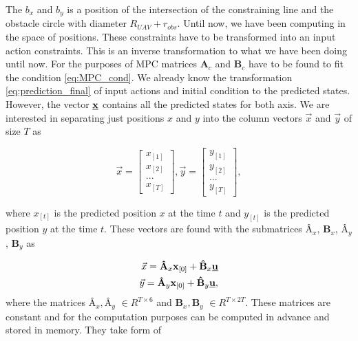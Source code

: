 \documentclass[a4paper,11pt,titlepage]{article}
\newcommand{\uvec}{\textbf{\underline{u}}}
\begin{document}
The $b_x$ and $b_y$ is a position of the intersection of the constraining line and the obstacle circle with diameter $R_{UAV}+r_{obs}$. 
Until now, we have been computing in the space of positions. These constraints have to be transformed into an input action constraints. This is an inverse transformation to what we have been doing until now. For the purposes of MPC matrices $\textbf{A}_c $ and $\textbf{B}_c$ have to be found to fit the condition \ref{eq:MPC_cond}. We already know the transformation \ref{eq:prediction_final} of input actions and initial condition to the predicted states. However, the vector $\textbf{\underline{x}}$ contains all the predicted states for both axis. We are interested in separating just positions $x$ and $y$ into the column vectors $\vec{x}$ and $\vec{y}$ of size $T$ as 

\begin{equation}
\vec{x} =
  \begin{bmatrix}
  x_{[1]} \\
  x_{[2]} \\
  ...	   \\
  x_{[T]}
  \end{bmatrix},\vec{y} = \begin{bmatrix}
  y_{[1]} \\
  y_{[2]} \\
  ...	   \\
  y_{[T]}
  \end{bmatrix},
\end{equation}

where $x_{[t]}$ is the predicted position $x$ at the time $t$ and $y_{[t]}$ is the predicted position $y$ at the time $t$.
These vectors are found with the submatrices $\textbf{\^A}_x$, $\textbf{\^B}_x$, $\textbf{\^A}_y$, $\textbf{\^B}_y$ as

\begin{equation}
\label{eq:pos_matrixes}
\begin{split}
\vec{x} = \textbf{\^A}_x \textbf{x}_{[0]} + \textbf{\^B}_x \uvec \\
\vec{y} = \textbf{\^A}_y \textbf{x}_{[0]} + \textbf{\^B}_y \uvec, \\
\end{split}
\end{equation}
where the matrices $\textbf{\^A}_x, \textbf{\^A}_y$ $\in R^{T \times 6}$ and $\textbf{\^B}_x, \textbf{\^B}_y$ $\in R^{T \times 2T}$. These matrices are constant and for the computation purposes can be computed in advance and stored in memory. They take form of 
\end{document}

